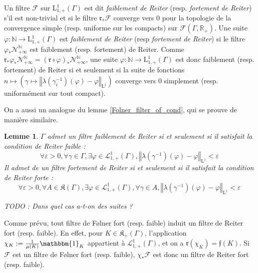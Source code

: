 \documentclass[a4paper,12pt]{article}
\newtheorem{lemma}[theorem]{Lemme}
\newcommand{\R}{\mathbb{R}}
\newcommand{\N}{\mathbb{N}}
\newcommand{\norm}[1]{\left\Vert #1\right\Vert}
\newcommand{\indic}{\mathbbm{1}}
\newcommand{\ssi}{si et seulement si }
\newcommand{\inv}{^{-1}}
\newcommand{\comp}{\circ}
\newcommand{\nhds}{\mathcal{N}}
\newcommand{\TODO}[1]{{\color{red}TODO :} #1}
\begin{document}
Un filtre $\mathscr{F}$ sur $\mathrm{L}^1_{1, +}(\Gamma)$ est dit \emph{faiblement de Reiter} (resp. \emph{fortement de Reiter}) s'il est non-trivial et si le filtre $\mathfrak{r}_*\mathscr{F}$ converge vers $0$ pour la 
topologie de la convergence simple (resp. uniforme sur les compacts) sur $\mathcal{F}(\Gamma, \R_+)$. 
Une suite $\varphi:\N\to\mathrm{L}^1_{1, +}(\Gamma)$ est \emph{faiblement de Reiter} (resp \emph{fortement de Reiter}) si le filtre $\varphi_*\nhds_{+\infty}^\N$ est faiblement (resp. fortement) de Reiter. Comme $\mathfrak{r}_*\varphi_*\nhds_{+\infty}^\N = (\mathfrak{r}\comp \varphi)_*\nhds_{+\infty}^\N$,
une suite $\varphi:\N\to\mathrm{L}^1_{1, +}(\Gamma)$ est donc faiblement (resp. fortement) de Reiter \ssi la suite de fonctions
$n\mapsto\left(\gamma\mapsto\norm{\lambda(\gamma_i\inv)(\varphi)-\varphi}_{\mathrm{L}^1}\right)$ converge vers $0$ simplement 
(resp. uniformément sur tout compact).

On a aussi un analogue du lemme \ref{Folner_filter_of_cond}, qui se prouve de manière similaire.

\begin{lemma}\label{Reiter_filter_of_cond}
    $\Gamma$ admet un filtre faiblement de Reiter \ssi il satisfait la 
    \emph{condition de Reiter faible} :
    \begin{equation}\label{weak_Reiter_cond}\tag{WR}
        \forall\varepsilon>0, \forall \gamma\in\Gamma, \exists \varphi\in\mathscr{L}^1_{1,+}(\Gamma), 
        \norm{\lambda(\gamma\inv)(\varphi)-\varphi}_{\mathrm{L}^1}<\varepsilon
    \end{equation}
    Il admet de un filtre fortement de Reiter \ssi il satisfait la \emph{condition de Reiter forte} : 
    \begin{equation}\label{strong_Reiter_cond}\tag{SR}
        \forall\varepsilon>0, \forall A\in\mathfrak{K}(\Gamma), \exists\varphi\in\mathscr{L}^1_{1,+}(\Gamma), \forall\gamma\in A, 
        \norm{\lambda(\gamma\inv)(\varphi)-\varphi}_{\mathrm{L}^1}<\varepsilon
    \end{equation}

    \TODO{Dans quel cas a-t-on des suites ?}
\end{lemma}

Comme prévu, tout filtre de F\o{}lner fort (resp. faible) induit un filtre de Reiter fort (resp. faible). En effet, pour $K\in\mathfrak{K}_+(\Gamma)$, l'application 
$\chi_K:=\frac1{\mu(K)}\indic_K$ appartient à $\mathscr{L}^1_{1,+}(\Gamma)$, et on a $\mathfrak{r}(\chi_K) = \mathfrak{f}(K)$.
Si $\mathscr{F}$ est un filtre de F\o{}lner fort (resp. faible), $\chi_*\mathscr{F}$ est donc un filtre de Reiter fort (resp. faible).
\end{document}
